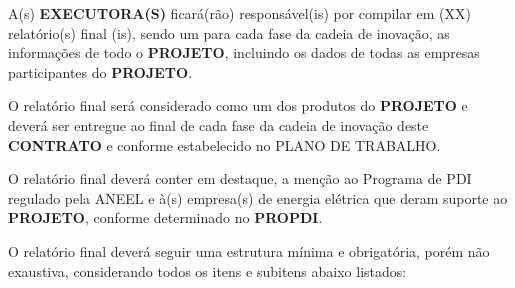 \xx A(s) \textbf{EXECUTORA(S)} ficará(rão) responsável(is) por compilar em (XX) relatório(s) final (is), sendo um para cada fase da cadeia de inovação, as informações de todo o \textbf{PROJETO}, incluindo os dados de todas as empresas participantes do \textbf{PROJETO}.

\xxx  O relatório final será considerado como um dos produtos do \textbf{PROJETO} e deverá ser entregue ao final de cada fase da cadeia de inovação deste \textbf{CONTRATO} e conforme estabelecido no PLANO DE TRABALHO.

\xxx  O relatório final deverá conter em destaque, a menção ao Programa de PDI regulado pela ANEEL e à(s) empresa(s) de energia elétrica que deram suporte ao \textbf{PROJETO}, conforme determinado no \textbf{PROPDI}.

\xxx  O relatório final deverá seguir uma estrutura mínima e obrigatória, porém não exaustiva, considerando todos os itens e subitens abaixo listados:

